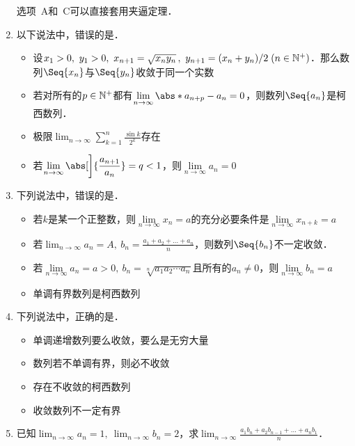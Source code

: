 \documentclass[a4paper,punct=CCT]{ctexbook}
\theoremstyle{definition}
\theoremstyle{remark}
\newif\ifshowsol
\begin{document}
\begin{enumerate}
  选项~A和~C可以直接套用夹逼定理．
  \fi

\item 以下说法中，错误的是\uline{\makebox[10em]{}}．
  \begin{itemize}
    \renewcommand{\labelitemi}{\faCircleThin}
    \addtolength{\itemsep}{1ex}
  \item 设\(x_1 > 0,\ y_1 > 0,\ x_{n+1} = \sqrt{x_n y_n}\,,\ y_{n+1} = (x_n+y_n)/2 \; (n \in \mathbb{N}^+)\)．那么数列\(\Seq{x_n}\)与\(\Seq{y_n}\)收敛于同一个实数
    \ifshowsol
  \item[\faCircle]
    \else
  \item
    \fi
    若对所有的\(p \in \mathbb{N}^+\)都有\(\lim\limits_{n\to\infty} \abs*{a_{n+p}-a_n} = 0\)，则数列\(\Seq{a_n}\)是柯西数列． %
  \item 极限\(\displaystyle \lim_{n\to\infty} \sum_{k=1}^n \frac{\sin k}{2^k}\)存在
  \item 若\(\displaystyle \lim_{n\to\infty} \abs[\bigg]{\frac{a_{n+1}}{a_n}} = q < 1\)，则\(\lim\limits_{n\to\infty} a_n = 0\)
  \end{itemize}

\item 下列说法中，错误的是\uline{\makebox[10em]{}}．
  \begin{itemize}
    \renewcommand{\labelitemi}{\faCircleThin}
    \addtolength{\itemsep}{.67ex}
  \item 若\(k\)是某一个正整数，则\(\lim\limits_{n\to\infty} x_n = a\)的充分必要条件是\(\lim\limits_{n\to\infty} x_{n+k} = a\)
    \ifshowsol
  \item[\faCircle]
    \else
  \item
    \fi
    若\(\displaystyle \lim_{n\to\infty} a_n = A,\ b_n = \frac{a_1 + a_2 + \dots + a_n}{n}\)，则数列\(\Seq{b_n}\)不一定收敛．
  \item 若\(\lim\limits_{n\to\infty} a_n = a > 0,\ b_n = \sqrt[n]{a_1 a_2 \dotsm a_n}\)且所有的\(a_n \ne 0\)，则\(\lim\limits_{n\to\infty} b_n = a\)
  \item 单调有界数列是柯西数列
  \end{itemize}

\item 下列说法中，正确的是\uline{\makebox[10em]{}}．
  \begin{itemize}
    \renewcommand{\labelitemi}{\faCircleThin}
    \ifshowsol
  \item[\faCircle]
    \else
  \item
    \fi
    单调递增数列要么收敛，要么是无穷大量
  \item 数列若不单调有界，则必不收敛
  \item 存在不收敛的柯西数列
  \item 收敛数列不一定有界
  \end{itemize}

\item 已知\(\displaystyle \lim_{n\to\infty} a_n = 1,\ \lim_{n\to\infty} b_n = 2\)，求\(\displaystyle \lim_{n\to\infty} \frac{a_1 b_n + a_2 b_{n-1} + \dots + a_n b_1}{n}\)．

  \ifshowsol
  可以模仿例~\ref{eg:limavg}的思路来证明这个极限的值是\(2\)．
  \fi
\end{enumerate}
\fi
\end{document}
